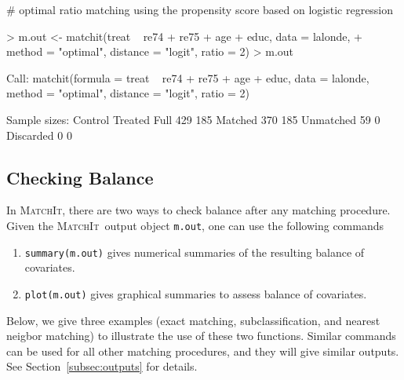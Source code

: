 \documentclass[oneside,letterpaper,titlepage]{article}
\newcommand{\MatchIt}{\textsc{MatchIt}}
\begin{document}
\# optimal ratio matching using the propensity score based on logistic regression
\begin{Schunk}
\begin{Sinput}
> m.out <- matchit(treat ~ re74 + re75 + age + educ, data = lalonde, 
+     method = "optimal", distance = "logit", ratio = 2)
> m.out
\end{Sinput}
\begin{Soutput}
Call: matchit(formula = treat ~ re74 + re75 + age + educ, data = lalonde,     method = "optimal", distance = "logit", ratio = 2)

Sample sizes:
          Control Treated
Full          429     185
Matched       370     185
Unmatched      59       0
Discarded       0       0
\end{Soutput}
\end{Schunk}


\subsection{Checking Balance}
\label{subsec:balance}

In \MatchIt, there are two ways to check balance after any matching
procedure. Given the \MatchIt\ output object {\tt m.out}, one can use
the following commands
\begin{enumerate}
\item \texttt{summary(m.out)} gives numerical summaries of the
  resulting balance of covariates.

\item \texttt{plot(m.out)} gives graphical summaries to assess balance
  of covariates.
\end{enumerate}
Below, we give three examples (exact matching, subclassification, and
nearest neigbor matching) to illustrate the use of these two
functions. Similar commands can be used for all other matching
procedures, and they will give similar outputs. See
Section~\ref{subsec:outputs} for details.
\end{document}
